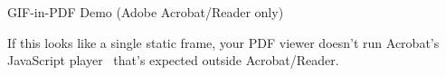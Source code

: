 \documentclass[aspectratio=169,11pt]{beamer}
\begin{document}
\begin{frame}{GIF-in-PDF Demo (Adobe Acrobat/Reader only)}
  \centering

  \vspace{0.4cm}
  {\footnotesize\color{slate} If this looks like a single static frame, your PDF viewer doesn't run
   Acrobat's JavaScript player \textemdash\ that's expected outside Acrobat/Reader.}
\end{frame}
\end{document}

